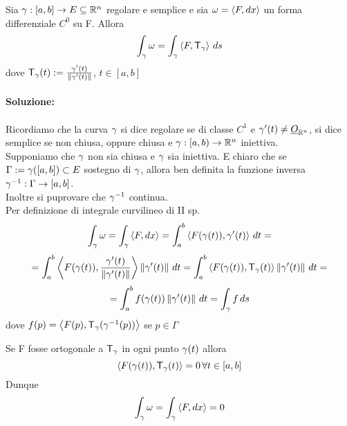 \begin{exercise}
  Sia $\gamma:[a,b]\to E\subseteq\mathbb{R}^n$ regolare e semplice e sia $\omega =\left\langle F,dx \right\rangle$ un forma differenziale $C^0$ su F.
  Allora $$\int_{\gamma} \omega = \int_{\gamma} \left\langle F,\mathsf{T}_{\gamma} \right\rangle \,ds$$
  dove $\mathsf{T}_{\gamma}(t) := \frac{\gamma'(t)}{\left\lVert\gamma'(t)\right\rVert}$, $t \in [a,b]$ \\\\
  \textbf{Soluzione:} \\\\
  Ricordiamo che la curva $\gamma$ si dice regolare se \ace di classe $C^1$ e 
  $\gamma'(t) \neq \underline{O}_{\mathbb{R}^n}$, si dice semplice se non \ace chiusa, oppure 
  \ace chiusa e $\gamma:[a,b) \to \mathbb{R}^n$ \ace iniettiva. \\
  Supponiamo che $\gamma$ non sia chiusa e $\gamma$ sia iniettiva. \ac{E} chiaro che
  se $\Gamma := \gamma([a,b]) \subset E$ sostegno di $\gamma$, allora \ace ben definita la funzione
  inversa $\gamma^{-1} : \Gamma \to [a,b]$. \\
  Inoltre si pu\aco provare che $\gamma^{-1}$ \ace continua. \\
  Per definizione di integrale curvilineo di II sp.
  $$\int_{\gamma} \omega = \int_{\gamma} \left\langle F,dx \right\rangle = \int_{a}^{b} \left\langle F(\gamma(t)),\gamma'(t) \right\rangle \,dt = $$
  $$= \int_{a}^{b} \left\langle F(\gamma(t)), \frac{\gamma'(t)}{\left\lVert\gamma'(t)\right\rVert} \right\rangle \left\lVert\gamma'(t)\right\rVert \,dt = 
    \int_{a}^{b} \left\langle F(\gamma(t)), \mathsf{T}_{\gamma}(t) \right\rangle \left\lVert\gamma'(t)\right\rVert \,dt = $$
  $$= \int_{a}^{b} f(\gamma(t))\left\lVert\gamma'(t)\right\rVert \, dt = \int_{\gamma} f \, ds$$
  dove $f(p) = \left\langle F(p),\mathsf{T}_{\gamma}(\gamma^{-1}(p)) \right\rangle$ se $p\in\Gamma$
\end{exercise}
\begin{osservazione}
  Se F fosse ortogonale a $\mathsf{T}_{\gamma}$ in ogni punto $\gamma(t)$ allora 
  $$\left\langle F(\gamma(t)), \mathsf{T}_{\gamma}(t) \right\rangle = 0 \, \forall t \in [a,b]$$
  Dunque $$\int_{\gamma} \omega = \int_{\gamma} \left\langle F,dx \right\rangle = 0$$
\end{osservazione}
